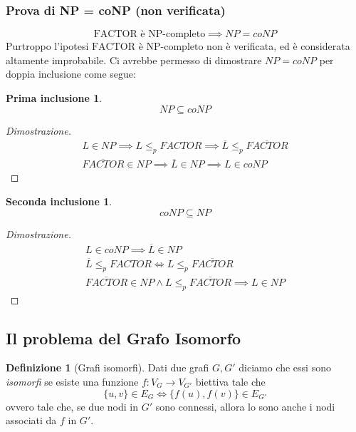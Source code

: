 \subsubsection{Prova di NP = coNP (non verificata)}
\[
	\text{FACTOR è NP-completo} \implies NP = coNP
\]
Purtroppo l'ipotesi $\text{FACTOR è NP-completo}$ non è verificata, ed è considerata altamente improbabile. Ci avrebbe permesso di dimostrare $NP = coNP$ per doppia inclusione come segue:
\\
\newtheorem*{NPcoNP}{Prima inclusione}
\begin{NPcoNP}
$$NP \subseteq coNP$$
\end{NPcoNP}

\begin{proof}[Dimostrazione]

\begin{align*}
	L \in NP \implies L \leq_{p} FACTOR \implies \overline{L} \leq_{p} \overline{FACTOR} \\
	\overline{FACTOR} \in NP \implies \overline{L} \in NP \implies L \in coNP
\end{align*}

\end{proof}

\newtheorem*{coNPNP}{Seconda inclusione}
\begin{coNPNP}
$$coNP \subseteq NP$$
\end{coNPNP}
\begin{proof}[Dimostrazione]

\begin{gather*}
	L \in coNP \implies \overline{L} \in NP \\ 
	\overline{L} \leq_{p} FACTOR \iff L \leq_{p} \overline{FACTOR} \\
	\overline{FACTOR} \in NP \land L \leq_p \overline{FACTOR} \implies L \in NP
\end{gather*}

\end{proof}

\subsection{Il problema del Grafo Isomorfo}

\theoremstyle{definition}
\newtheorem*{def2}{Definizione}
\begin{def2}[Grafi isomorfi]
	Dati due grafi $G, G'$ diciamo che essi sono \emph{isomorfi} se esiste una funzione $f: V_G \to V_{G'}$ biettiva tale che	
	$$ \{ u, v \} \in E_G \iff \{ f(u), f(v) \} \in E_{G'}$$
	ovvero tale che, se due nodi in $G'$ sono connessi, allora lo sono anche i nodi associati da $f$ in $G'$.
\end{def2}

